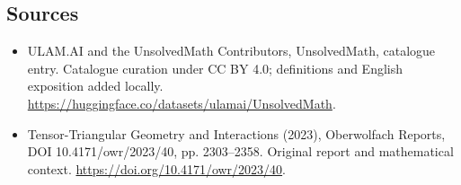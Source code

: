 \documentclass[11pt]{article}
\begin{document}
\subsection{Sources}
\begin{itemize}
\item[\hypertarget{source:statement:1}{S1}] ULAM.AI and the UnsolvedMath Contributors, UnsolvedMath, catalogue entry. Catalogue curation under CC BY 4.0; definitions and English exposition added locally.
\url{https://huggingface.co/datasets/ulamai/UnsolvedMath}.
\item[\hypertarget{source:statement:2}{S2}] Tensor-Triangular Geometry and Interactions (2023), Oberwolfach Reports, DOI 10.4171/owr/2023/40, pp. 2303--2358. Original report and mathematical context.
\url{https://doi.org/10.4171/owr/2023/40}.
\end{itemize}
\label{end:statement}
\end{document}
